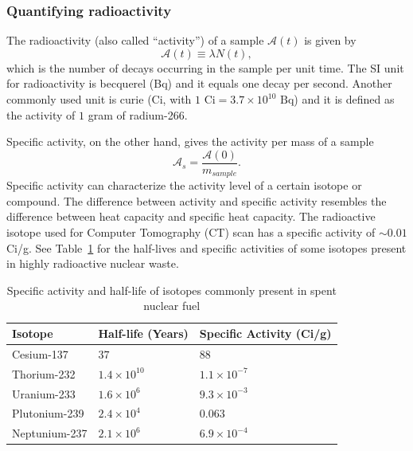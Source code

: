 \documentclass[nofootinbib,preprint,aps]{revtex4-1}
\begin{document}
        \subsubsection{Quantifying radioactivity}
        The radioactivity (also called ``activity'') of a sample $\mathcal{A}(t)$ is given by
        \begin{equation}
            \label{eq:act}
            \mathcal{A}(t)\equiv \lambda N(t),
        \end{equation}
        which is the number of decays occurring in the sample per unit time. The SI
        unit for radioactivity is becquerel (Bq) and it equals one decay per second. Another commonly used
        unit is curie (Ci, with $1\text{ Ci}=3.7\times 10^{10}\text{ Bq}$) and it is defined as
        the activity of $1$ gram of radium-266.

        Specific activity, on the other hand, gives the activity per mass of a sample
        \begin{equation}
        \mathcal{A}_s = \frac{\mathcal{A}(0)}{{m_{sample}}}.
        \end{equation}
        Specific activity can characterize the activity level of a certain isotope or compound.
        The difference between
        activity and specific activity resembles the difference between heat capacity and specific heat
        capacity.
        The radioactive isotope used for Computer Tomography (CT) scan has a specific activity
        of $\sim 0.01$ Ci/g. See Table~\ref{tab:hl} for the half-lives and specific activities
        of some isotopes present in highly radioactive nuclear waste.
        \begin{table}
            \centering
            \caption{Specific activity and half-life of isotopes commonly present in spent nuclear fuel \cite{toi}}
            \begin{ruledtabular}
                \begin{tabular}{l l l}
                Isotope & Half-life (Years) & Specific Activity (Ci/g)\\
                \hline
                Cesium-137 & $37$ & $88$\\
                Thorium-232 & $1.4 \times 10^{10}$ & $1.1\times 10^{-7}$\\
                Uranium-233 & $1.6\times 10^6$ & $9.3\times 10^{-3}$\\
                Plutonium-239 & $2.4\times 10^4$ & $0.063$\\
                Neptunium-237 & $2.1\times 10^6$ & $6.9\times 10^{-4}$\\
            \end{tabular}
            \label{tab:hl}
            \end{ruledtabular}
        \end{table}
\end{document}
